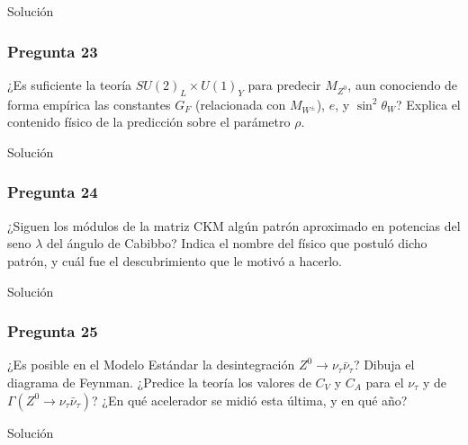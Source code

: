 Solución

\vspace*{2em}

\begin{Enunciado}
	\subsubsection*{Pregunta 23}

	¿Es suficiente la teoría $SU(2)_L \times U(1)_Y$ para predecir $M_{Z^0}$, aun conociendo de forma empírica las constantes $G_F$ (relacionada con $M_{W^\pm}$), $e$, y $\sin^2\theta_W$? Explica el contenido físico de la predicción sobre el parámetro $\rho$.

\end{Enunciado}

Solución

\vspace*{2em}

\begin{Enunciado}
	\subsubsection*{Pregunta 24}

	¿Siguen los módulos de la matriz CKM algún patrón aproximado en potencias del seno $\lambda$ del ángulo de Cabibbo? Indica el nombre del físico que postuló dicho patrón, y cuál fue el descubrimiento que le motivó a hacerlo.

\end{Enunciado}

Solución

\vspace*{2em}

\begin{Enunciado}
	\subsubsection*{Pregunta 25}

	¿Es posible en el Modelo Estándar la desintegración $Z^0 \to \nu_\tau \bar{\nu}_\tau$? Dibuja el diagrama de Feynman. ¿Predice la teoría los valores de $C_V$ y $C_A$ para el $\nu_\tau$ y de $\Gamma(Z^0 \to \nu_\tau \bar{\nu}_\tau)$? ¿En qué acelerador se midió esta última, y en qué año?

\end{Enunciado}

Solución

\vspace*{2em}


